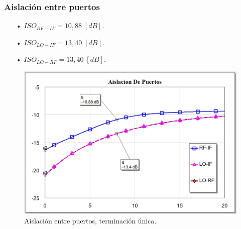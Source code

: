 \documentclass[twocolumn]{article}
\begin{document}
\subsubsection{Aislación entre puertos}
%
\begin{itemize}\itemsep0em
\item[•]  $ISO_{RF-IF} = 10,88 \; [dB]$.
\item[•]  $ISO_{LO-IF} = 13,40 \; [dB]$.
\item[•]  $ISO_{LO-RF} = 13,40 \; [dB]$.
\end{itemize}
%
\begin{figure}[h]
  \centering    
	\includegraphics[scale=0.25]{imagenes/ISO1.jpg}
	\caption{Aislación entre puertos, terminación única.}\label{fig:ISO1}
\end{figure}
\clearpage
%
\end{document}
